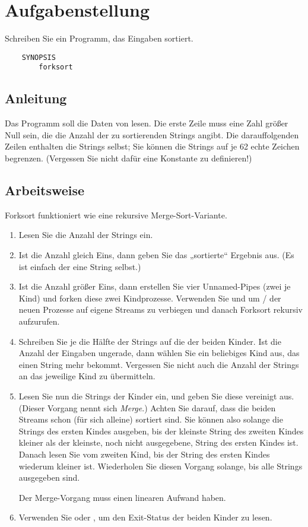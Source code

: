 




\section*{Aufgabenstellung}
Schreiben Sie ein Programm, das Eingaben sortiert.
\begin{verbatim}
    SYNOPSIS
        forksort
\end{verbatim}

\subsection*{Anleitung}
Das Programm soll die Daten von  lesen. Die erste Zeile muss eine
Zahl größer Null sein, die die Anzahl der zu sortierenden Strings angibt.
Die darauffolgenden Zeilen enthalten die Strings selbst; Sie können die
Strings auf je 62 echte Zeichen begrenzen. (Vergessen Sie nicht dafür eine
Konstante zu definieren!)

\subsection*{Arbeitsweise}
Forksort funktioniert wie eine rekursive Merge-Sort-Variante.
\begin{enumerate}
\item Lesen Sie die Anzahl der Strings ein.
\item Ist die Anzahl gleich Eins, dann geben Sie das „sortierte“
  Ergebnis aus. (Es ist einfach der eine String selbst.)
\item Ist die Anzahl größer Eins, dann erstellen Sie vier Unnamed-Pipes (zwei
  je Kind) und forken diese zwei Kindprozesse. Verwenden Sie  und
   um / der neuen Prozesse auf eigene Streams
  zu verbiegen und danach Forksort rekursiv aufzurufen.
\item Schreiben Sie je die Hälfte der Strings auf die  der
  beiden Kinder. Ist die Anzahl der Eingaben ungerade, dann wählen Sie
  ein beliebiges Kind aus, das einen String mehr bekommt. Vergessen Sie nicht
  auch die Anzahl der Strings an das jeweilige Kind zu übermitteln.
\item Lesen Sie nun die Strings der Kinder ein, und geben Sie diese vereinigt
  aus. (Dieser Vorgang nennt sich \emph{Merge}.) Achten Sie darauf, dass die
  beiden Streams schon (für sich alleine) sortiert sind. Sie können also
  solange die Strings des ersten Kindes ausgeben, bis der kleinste String des
  zweiten Kindes kleiner als der kleinste, noch nicht ausgegebene, String des
  ersten Kindes ist. Danach lesen Sie vom zweiten Kind, bis der String des
  ersten Kindes wiederum kleiner ist. Wiederholen Sie diesen Vorgang solange,
  bis alle Strings ausgegeben sind.

  Der Merge-Vorgang muss einen linearen Aufwand haben.
\item Verwenden Sie  oder , um den Exit-Status
  der beiden Kinder zu lesen.
\end{enumerate}


